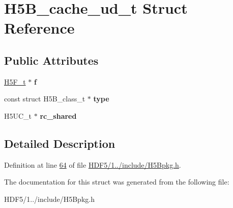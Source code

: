 \hypertarget{struct_h5_b__cache__ud__t}{}\section{H5\+B\+\_\+cache\+\_\+ud\+\_\+t Struct Reference}
\label{struct_h5_b__cache__ud__t}
\subsection*{Public Attributes}
\begin{DoxyCompactItemize}
\item 
\mbox{\label{struct_h5_b__cache__ud__t_afc33fb1b81da371707ee7a4c5ad757ba}} 
\hyperlink{struct_h5_f__t}{H5\+F\+\_\+t} $\ast$ {\bfseries f}
\item 
\mbox{\label{struct_h5_b__cache__ud__t_a49f885ce85991c7f53df0138b5c933fb}} 
const struct H5\+B\+\_\+class\+\_\+t $\ast$ {\bfseries type}
\item 
\mbox{\label{struct_h5_b__cache__ud__t_a4d733108720911e5e239cb71ae4e5ffa}} 
H5\+U\+C\+\_\+t $\ast$ {\bfseries rc\+\_\+shared}
\end{DoxyCompactItemize}


\subsection{Detailed Description}


Definition at line \hyperlink{_h_d_f5_21_810_81_2include_2_h5_bpkg_8h_source_l00064}{64} of file \hyperlink{_h_d_f5_21_810_81_2include_2_h5_bpkg_8h_source}{H\+D\+F5/1../include/\+H5\+Bpkg.\+h}.



The documentation for this struct was generated from the following file\+:\begin{DoxyCompactItemize}
\item 
H\+D\+F5/1../include/\+H5\+Bpkg.\+h\end{DoxyCompactItemize}
